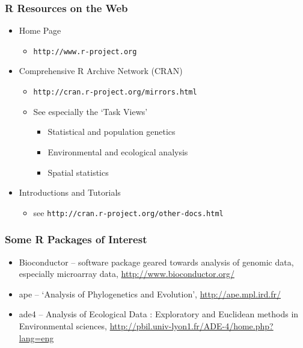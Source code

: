 \documentclass{beamer}
\begin{document}
\begin{frame}
  \frametitle{R Resources on the Web}
\begin{itemize}

\item Home Page
\begin{itemize}
	\item \texttt{http://www.r-project.org}
\end{itemize}

\item Comprehensive R Archive Network (CRAN)
\begin{itemize}
	\item \texttt{http://cran.r-project.org/mirrors.html}
	\item See especially the `Task Views'
			\begin{itemize}
				\item Statistical and population genetics
				\item Environmental and ecological analysis
				\item Spatial statistics
			\end{itemize}
\end{itemize}

\item Introductions and Tutorials
\begin{itemize}
	\item see \texttt{http://cran.r-project.org/other-docs.html}
\end{itemize}

\end{itemize}
\end{frame}

\begin{frame}
  \frametitle{Some R Packages of Interest}

\begin{itemize}
    \item Bioconductor -- software package geared towards analysis of genomic data, especially  microarray data, \url{http://www.bioconductor.org/}
        \item ape -- `Analysis of Phylogenetics and Evolution', \url{http://ape.mpl.ird.fr/}
    \item ade4 -- Analysis of Ecological Data : Exploratory and Euclidean methods in Environmental sciences, \url{http://pbil.univ-lyon1.fr/ADE-4/home.php?lang=eng}
\end{itemize}



\end{frame}
\end{document}
